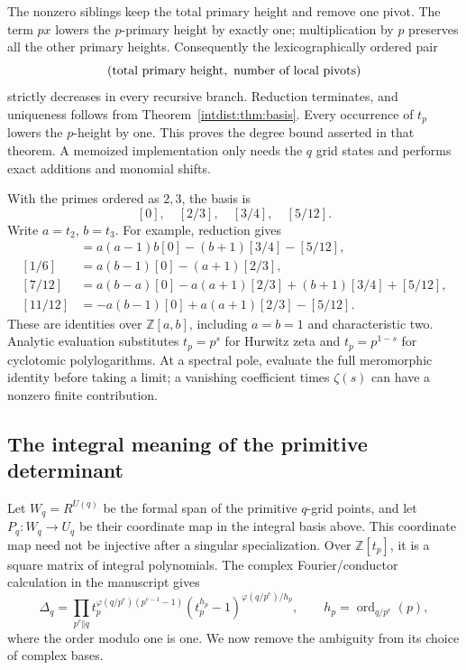 The nonzero siblings keep the total primary height and remove one
pivot. The term $p x$ lowers the $p$-primary height by exactly one;
multiplication by $p$ preserves all the other primary heights.
Consequently the lexicographically ordered pair
\[
 (\hbox{total primary height},\ \hbox{number of local pivots})
\]
strictly decreases in every recursive branch. Reduction terminates,
and uniqueness follows from Theorem~\ref{intdist:thm:basis}. Every
occurrence of $t_p$ lowers the $p$-height by one. This proves the degree
bound asserted in that theorem. A memoized implementation only needs
the $q$ grid states and performs exact additions and monomial shifts.

\begin{example}
With the primes ordered as $2,3$, the basis is
\[
 [0],\quad[2/3],\quad[3/4],\quad[5/12].
\]
Write $a=t_2$, $b=t_3$. For example, reduction gives
\begin{align}
 [1/12]&=a(a-1)b[0]-(b+1)[3/4]-[5/12],\label{intdist:eq:q12-one}\\
 [1/6]&=a(b-1)[0]-(a+1)[2/3],\\
 [7/12]&=a(b-a)[0]-a(a+1)[2/3]+(b+1)[3/4]+[5/12],\\
 [11/12]&=-a(b-1)[0]+a(a+1)[2/3]-[5/12].
\end{align}
These are identities over $\mathbb Z[a,b]$, including $a=b=1$ and
characteristic two. Analytic evaluation substitutes $t_p=p^s$ for
Hurwitz zeta and $t_p=p^{1-s}$ for cyclotomic polylogarithms. At a
spectral pole, evaluate the full meromorphic identity before taking a
limit; a vanishing coefficient times $\zeta(s)$ can have a nonzero
finite contribution.
\end{example}

\subsection{The integral meaning of the primitive determinant}

Let $W_q=R^{U(q)}$ be the formal span of the primitive $q$-grid points,
and let $P_q:W_q\to U_q$ be their coordinate map in the integral basis
above. This coordinate map need not be injective after a singular
specialization. Over $\mathbb Z[t_p]$, it is a square matrix of integral
polynomials. The complex Fourier/conductor calculation in the
manuscript gives
\[
 \Delta_q=\prod_{p^e\Vert q}
 t_p^{\varphi(q/p^e)(p^{e-1}-1)}
 (t_p^{h_p}-1)^{\varphi(q/p^e)/h_p},
 \qquad h_p=\operatorname{ord}_{q/p^e}(p),
\]
where the order modulo one is one. We now remove the ambiguity from
its choice of complex bases.

